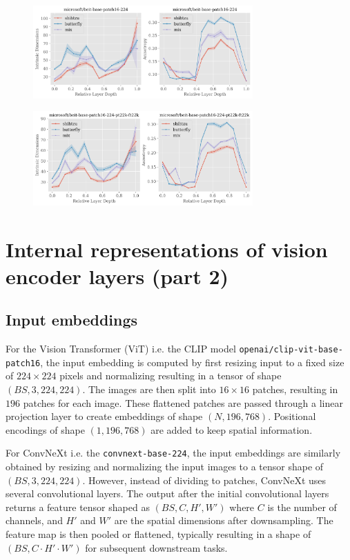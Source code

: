 \documentclass[
  11pt,
  a4paper,
  onecolumn]{article}
\begin{document}
\begin{figure}[h!]
\centering
\includegraphics[width=0.75\textwidth]{figures/microsoft-beit-base-patch16-224_topology.png}
\end{figure}

\begin{figure}[h!]
\centering
\includegraphics[width=0.75\textwidth]{figures/microsoft-beit-base-patch16-224-pt22k-ft22k_topology.png}
\end{figure}


\section{Internal representations of vision encoder layers (part 2)}\label{part_2}

\subsection{Input embeddings}

For the Vision Transformer (ViT) i.e. the CLIP model \texttt{openai/clip-vit-base-patch16}, the input embedding is computed by first resizing input to a fixed size of $224 \times 224$ pixels and normalizing resulting in a tensor of shape $(BS, 3, 224, 224)$. The images are then split into $16 \times 16$ patches, resulting in $196$ patches for each image. These flattened patches are passed through a linear projection layer to create embeddings of shape $(N, 196, 768)$. Positional encodings of shape $(1, 196, 768)$ are added to keep spatial information.

For ConvNeXt i.e. the \texttt{convnext-base-224}, the input embeddings are similarly obtained by resizing and normalizing the input images to a tensor shape of $(BS, 3, 224, 224)$. However, instead of dividing to patches, ConvNeXt uses several convolutional layers. The output after the initial convolutional layers returns a feature tensor shaped as $(BS, C, H', W')$ where $C$ is the number of channels, and $H'$ and $W'$ are the spatial dimensions after downsampling. The feature map is then pooled or flattened, typically resulting in a shape of $(BS, C \cdot H' \cdot W')$ for subsequent downstream tasks.
\end{document}
